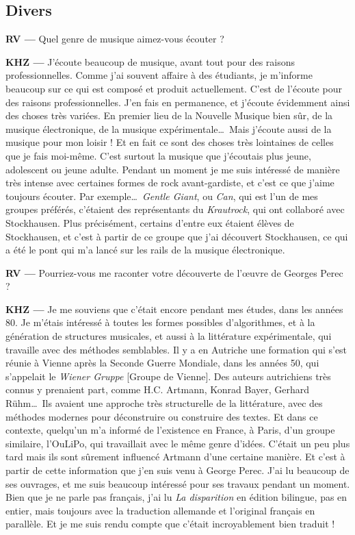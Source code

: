 \documentclass[a4paper,12pt]{article}
\begin{document}
\subsection{Divers}

\textbf{RV ---} Quel genre de musique aimez-vous écouter ?

\textbf{KHZ ---} J'écoute beaucoup de musique, avant tout pour des raisons professionnelles. Comme j'ai souvent affaire à des étudiants, je m'informe beaucoup sur ce qui est composé et produit actuellement. C'est de l'écoute pour des raisons professionnelles. J'en fais en permanence, et j'écoute évidemment ainsi des choses très variées. En premier lieu de la Nouvelle Musique bien sûr, de la musique électronique, de la musique expérimentale\dots~Mais j'écoute aussi de la musique pour mon loisir ! Et en fait ce sont des choses très lointaines de celles que je fais moi-même. C'est surtout la musique que j'écoutais plus jeune, adolescent ou jeune adulte. Pendant un moment je me suis intéressé de manière très intense avec certaines formes de rock avant-gardiste, et c'est ce que j'aime toujours écouter. Par exemple\dots~\emph{Gentle Giant}, ou \emph{Can}, qui est l'un de mes groupes préférés, c'étaient des représentants du \emph{Krautrock}, qui ont collaboré avec Stockhausen. Plus précisément, certains d'entre eux étaient élèves de Stockhausen, et c'est à partir de ce groupe que j'ai découvert Stockhausen, ce qui a été le pont qui m'a lancé sur les rails de la musique électronique.

\textbf{RV ---} Pourriez-vous me raconter votre découverte de l'œuvre de Georges Perec ?

\textbf{KHZ ---} Je me souviens que c'était encore pendant mes études, dans les années 80. Je m'étais intéressé à toutes les formes possibles d'algorithmes, et à la génération de structures musicales, et aussi à la littérature expérimentale, qui travaille avec des méthodes semblables. Il y a en Autriche une formation qui s'est réunie à Vienne après la Seconde Guerre Mondiale, dans les années 50, qui s'appelait le \emph{Wiener Gruppe} [Groupe de Vienne]. Des auteurs autrichiens très connus y prenaient part, comme H.C. Artmann, Konrad Bayer, Gerhard Rühm\dots~Ils avaient une approche très structurelle de la littérature, avec des méthodes modernes pour déconstruire ou construire des textes. Et dans ce contexte, quelqu'un m'a informé de l'existence en France, à Paris, d'un groupe similaire, l'OuLiPo, qui travaillait avec le même genre d'idées. C'était un peu plus tard mais ils sont sûrement influencé Artmann d'une certaine manière. Et c'est à partir de cette information que j'en suis venu à George Perec. J'ai lu beaucoup de ses ouvrages, et me suis beaucoup intéressé pour ses travaux pendant un moment. Bien que je ne parle pas français, j'ai lu \emph{La disparition} en édition bilingue, pas en entier, mais toujours avec la traduction allemande et l'original français en parallèle. Et je me suis rendu compte que c'était incroyablement bien traduit !
\end{document}
